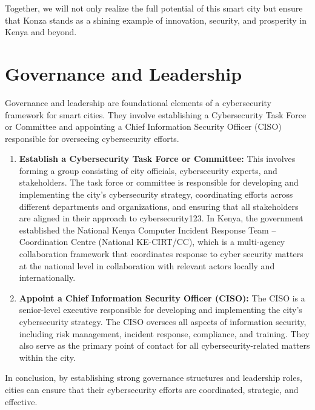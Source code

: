 \documentclass{article}
\begin{document}
Together, we will not only realize the full potential of this smart city but ensure that Konza stands as a shining example of innovation, security, and prosperity in Kenya and beyond.


\section{Governance and Leadership}
Governance and leadership are foundational elements of a cybersecurity framework for smart cities. They involve establishing a Cybersecurity Task Force or Committee and appointing a Chief Information Security Officer (CISO) responsible for overseeing cybersecurity efforts\cite{riskoptics-2022}\cite{cybersecurity-and-infrastructure-security-agency-cisa-cybersecurity-governance-no-date}\cite{atkinson-2021}.
\begin{enumerate}[label=\alph*)]
    \item \textbf{Establish a Cybersecurity Task Force or Committee:} This involves forming a group consisting of city officials, cybersecurity experts, and stakeholders\cite{riskoptics-2022}\cite{cybersecurity-and-infrastructure-security-agency-cisa-cybersecurity-governance-no-date}\cite{atkinson-2021}. The task force or committee is responsible for developing and implementing the city’s cybersecurity strategy, coordinating efforts across different departments and organizations, and ensuring that all stakeholders are aligned in their approach to cybersecurity123. In Kenya, the government established the National Kenya Computer Incident Response Team – Coordination Centre (National KE-CIRT/CC), which is a multi-agency collaboration framework that coordinates response to cyber security matters at the national level in collaboration with relevant actors locally and internationally\cite{national-computer-and-cybercrimes-coordination-committee-no-date}.
    \item \textbf{Appoint a Chief Information Security Officer (CISO):} The CISO is a senior-level executive responsible for developing and implementing the city’s cybersecurity strategy\cite{riskoptics-2022}\cite{cybersecurity-and-infrastructure-security-agency-cisa-cybersecurity-governance-no-date}\cite{atkinson-2021}. The CISO oversees all aspects of information security, including risk management, incident response, compliance, and training\cite{riskoptics-2022}\cite{cybersecurity-and-infrastructure-security-agency-cisa-cybersecurity-governance-no-date}\cite{atkinson-2021}. They also serve as the primary point of contact for all cybersecurity-related matters within the city\cite{riskoptics-2022}\cite{cybersecurity-and-infrastructure-security-agency-cisa-cybersecurity-governance-no-date}\cite{atkinson-2021}.



\end{enumerate}
In conclusion, by establishing strong governance structures and leadership roles, cities can ensure that their cybersecurity efforts are coordinated, strategic, and effective\cite{riskoptics-2022}\cite{cybersecurity-and-infrastructure-security-agency-cisa-cybersecurity-governance-no-date}\cite{atkinson-2021}.
\end{document}
